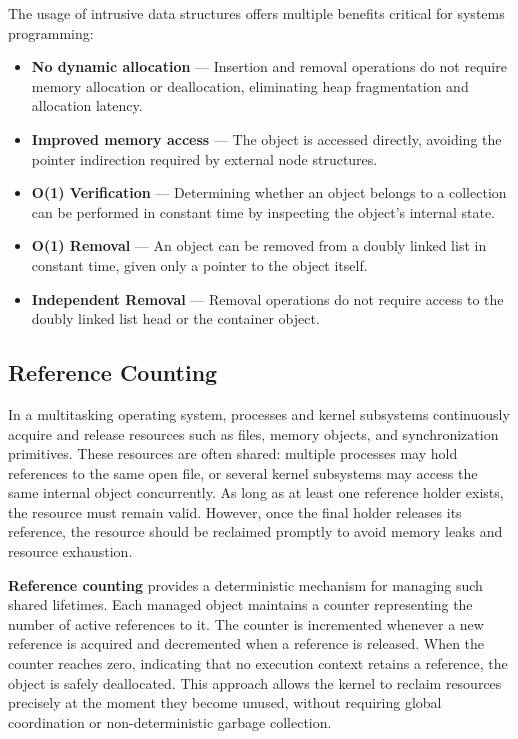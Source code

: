 \documentclass[a4paper,10pt,twoside]{report}
\theoremstyle{definition}
\begin{document}
The usage of intrusive data structures offers multiple benefits critical for systems programming:
\begin{itemize}
    \item \textbf{No dynamic allocation} --- Insertion and removal operations do not require memory allocation or deallocation, eliminating heap fragmentation and allocation latency.
    \item \textbf{Improved memory access} --- The object is accessed directly, avoiding the pointer indirection required by external node structures.
    \item \textbf{O(1) Verification} --- Determining whether an object belongs to a collection can be performed in constant time by inspecting the object's internal state.
    \item \textbf{O(1) Removal} --- An object can be removed from a doubly linked list in constant time, given only a pointer to the object itself.
    \item \textbf{Independent Removal} --- Removal operations do not require access to the doubly linked list head or the container object.
\end{itemize}

\subsection{Reference Counting}
\label{subsec:refcounting}

In a multitasking operating system, processes and kernel subsystems continuously acquire and release resources such as files, memory objects, and synchronization primitives. These resources are often shared: multiple processes may hold references to the same open file, or several kernel subsystems may access the same internal object concurrently. As long as at least one reference holder exists, the resource must remain valid. However, once the final holder releases its reference, the resource should be reclaimed promptly to avoid memory leaks and resource exhaustion.

\textbf{Reference counting} provides a deterministic mechanism for managing such shared lifetimes. Each managed object maintains a counter representing the number of active references to it. The counter is incremented whenever a new reference is acquired and decremented when a reference is released. When the counter reaches zero, indicating that no execution context retains a reference, the object is safely deallocated. This approach allows the kernel to reclaim resources precisely at the moment they become unused, without requiring global coordination or non-deterministic garbage collection.
\end{document}
